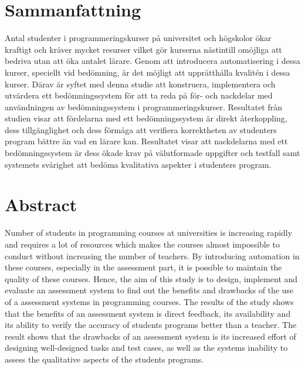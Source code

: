 \documentclass[a4paper,11pt]{article}
\begin{document}
{\newpage

\mbox{}

\newpage

\section*{Sammanfattning}

Antal studenter i programmeringskurser på universitet och högskolor ökar kraftigt och kräver mycket resurser vilket gör kurserna nästintill omöjliga att bedriva utan att öka antalet lärare. Genom att introducera automatisering i dessa kurser, speciellt vid bedömning, är det möjligt att upprätthålla kvalitén i dessa kurser. Därav är syftet med denna studie att konstruera, implementera och utvärdera ett bedömningssystem för att ta reda på för- och nackdelar med användningen av bedömningssystem i programmeringskurser. Resultatet från studien visar att fördelarna med ett bedömningssystem är direkt återkoppling, dess tillgänglighet och dess förmåga att verifiera korrektheten av studenters program bättre än vad en lärare kan. Resultatet visar att nackdelarna med ett bedömningssystem är dess ökade krav på välutformade uppgifter och testfall samt systemets svårighet att bedöma kvalitativa aspekter i studenters program.

\newpage

\mbox{}

\newpage

\section*{Abstract}

Number of students in programming courses at universities is increasing rapidly and requires a lot of resources which makes the courses almost impossible to conduct without increasing the number of teachers. By introducing automation in these courses, especially in the assessment part, it is possible to maintain the quality of these courses. Hence, the aim of this study is to design, implement and evaluate an assessment system to find out the benefits and drawbacks of the use of a assessment systems in programming courses. The results of the study shows that the benefits of an assessment system is direct feedback, its availability and its ability to verify the accuracy of students programs better than a teacher. The result shows that the drawbacks of an assessment system is its increased effort of designing well-designed tasks and test cases, as well as the systems inability to assess the qualitative aspects of the students programs.

}
\end{document}
